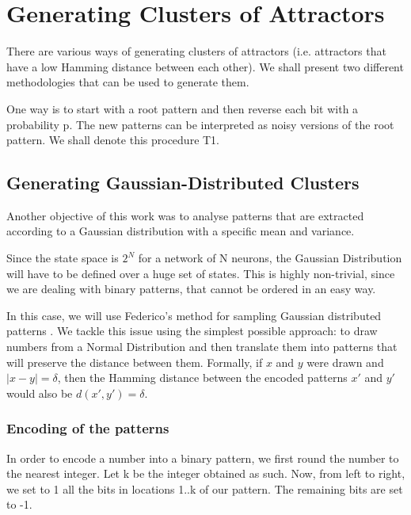 

\section{Generating Clusters of Attractors}

There are various ways of generating clusters of attractors (i.e. attractors that have a low Hamming distance between each other). We shall present two different methodologies that can be used to generate them.

One way is to start with a root pattern and then reverse each bit with a probability p. The new patterns can be interpreted as noisy versions of the root pattern. We shall denote this procedure T1.

\subsection{Generating Gaussian-Distributed Clusters}

Another objective of this work was to analyse patterns that are extracted according to a Gaussian distribution with a specific mean and variance.

Since the state space is \( 2^N \) for a network of N neurons, the Gaussian Distribution will have to be defined over a huge set of states. This is highly non-trivial, since we are dealing with binary patterns, that cannot be ordered in an easy way.

In this case, we will use Federico's method for sampling Gaussian distributed patterns \cite[p.~33]{federico}. We tackle this issue using the simplest possible approach: to draw numbers from a Normal Distribution and then translate them into patterns that will preserve the distance between them. Formally, if \(x\) and \(y\) were drawn and \( |x-y|=\delta\), then the Hamming distance between the encoded patterns \(x'\) and \(y'\) would also be \( d(x',y')=\delta\).

\subsubsection{Encoding of the patterns}

In order to encode a number into a binary pattern, we first round the number to the nearest integer. Let k be the integer obtained as such. Now, from left to right, we set to 1 all the bits in locations 1..k of our pattern. The remaining bits are set to -1.

